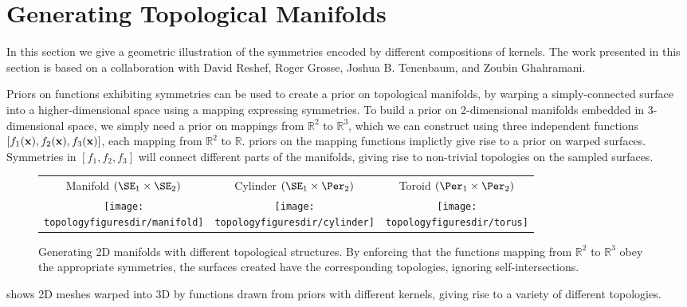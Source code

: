 \section{Generating Topological Manifolds}
\label{sec:topological-manifolds}

In this section we give a geometric illustration of the symmetries encoded by different compositions of kernels.
The work presented in this section is based on a collaboration with David Reshef, Roger Grosse, Joshua B. Tenenbaum, and Zoubin Ghahramani.

Priors on functions exhibiting symmetries can be used to create a prior on topological manifolds, by warping a simply-connected surface into a higher-dimensional space using a mapping expressing symmetries. %
To build a prior on 2-dimensional manifolds embedded in 3-dimensional space, we simply need a prior on mappings from $\mathbb{R}^2$ to $\mathbb{R}^3$, which we can construct using three independent functions $[f_1({\bf{x}}), f_2({\bf{x}}), f_3({\bf{x}})]$, each mapping from $\mathbb{R}^2$ to $\mathbb{R}$.
\gp{} priors on the mapping functions implictly give rise to a prior on warped surfaces.
Symmetries in $[f_1, f_2, f_3]$ will connect different parts of the manifolds, giving rise to non-trivial topologies on the sampled surfaces.
%
\begin{figure}
\renewcommand{\tabcolsep}{1mm}
\begin{tabular}{ccc}
Manifold $( \SE_1 \times \SE_2 )$  & Cylinder $( \SE_1 \times \Per_2 )$ & Toroid $( \Per_1 \times \Per_2 )$\\
\hspace{-0.5cm}\texttt{[image: \\topologyfiguresdir/manifold]} &
\texttt{[image: \\topologyfiguresdir/cylinder]} &
\texttt{[image: \\topologyfiguresdir/torus]} \\
\end{tabular}
\caption[Generating 2D manifolds with different topological structures]{
Generating 2D manifolds with different topological structures.
By enforcing that the functions mapping from $\mathbb{R}^2$ to $\mathbb{R}^3$ obey the appropriate symmetries, the surfaces created have the corresponding topologies, ignoring self-intersections.
}
\label{fig:gen_surf}
\end{figure}
%
 shows 2D meshes warped into 3D by functions drawn from \gp{} priors with different kernels, giving rise to a variety of different topologies.

